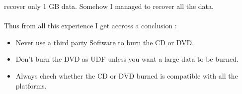 recover only 1 GB data. Somehow I managed to recover all the data. \\\\
Thus from all this experience I get accross a conclusion :
\begin{itemize}
\item Never use a third party Software to burn the CD or DVD.
\item Don't burn the DVD as UDF unless you want a large data to be burned.
\item Always chech whether the CD or DVD burned is compatible with all the platforms.
\end{itemize}


 
